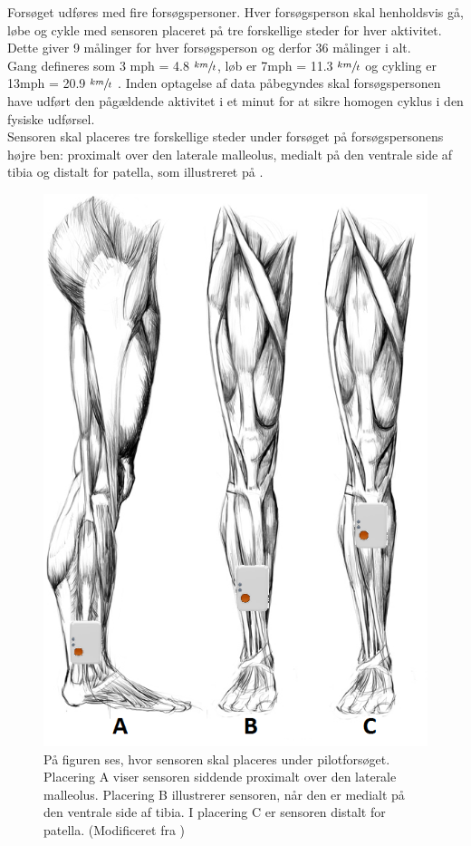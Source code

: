 Forsøget udføres med fire forsøgspersoner. Hver forsøgsperson skal henholdsvis gå, løbe og cykle med sensoren placeret på tre forskellige steder for hver aktivitet. Dette giver 9 målinger for hver forsøgsperson og derfor 36 målinger i alt. \\ 
Gang defineres som 3 mph = 4.8 $\sfrac{km}{t}$, løb er 7mph = 11.3 $\sfrac{km}{t}$ og cykling er 13mph = 20.9 $\sfrac{km}{t}$ \citep{Miles2007}. Inden optagelse af data påbegyndes skal forsøgspersonen have udført den pågældende aktivitet i et minut for at sikre homogen cyklus i den fysiske udførsel. \\
Sensoren skal placeres tre forskellige steder under forsøget på forsøgspersonens højre ben: proximalt over den laterale malleolus, medialt på den ventrale side af tibia og distalt for patella, som illustreret på .
\begin{figure}[H]
	\centering
	\includegraphics[scale=0.6]{figures/qBilag/Sensor_placering.png}
	\caption{På figuren ses, hvor sensoren skal placeres under pilotforsøget. Placering A viser sensoren siddende proximalt over den laterale malleolus. Placering B illustrerer sensoren, når den er medialt på den ventrale side af tibia. I placering C er sensoren distalt for patella. (Modificeret fra \cite{Perna2016,Shimmer2016})}
	\label{fig:sensor_placering}
\end{figure}
